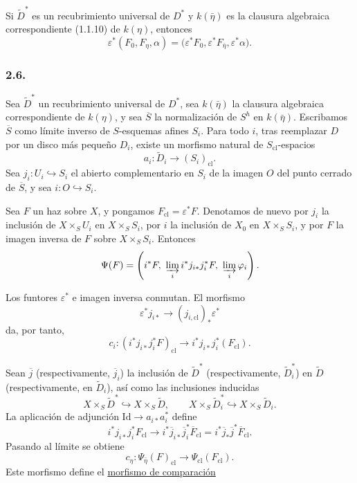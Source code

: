 \pageoriginale

Si $\widetilde D^*$ es un recubrimiento universal de $D^*$ y
$k(\bar\eta)$ es la clausura algebraica correspondiente (1.1.10) de
$k(\eta)$, entonces
\[
\varepsilon^*(F_0,F_\eta,\alpha)
=\bigl(\varepsilon^*F_0,\varepsilon^*F_{\bar\eta},
\varepsilon^*\alpha\bigr).
\]

\subsubsection*{2.6.}
Sea $\widetilde D^*$ un recubrimiento universal de $D^*$, sea
$k(\bar\eta)$ la clausura algebraica correspondiente de $k(\eta)$, y sea
$\overline S$ la normalización de $S^h$ en $k(\bar\eta)$. Escribamos
$\overline S$ como límite inverso de $S$-esquemas afines $S_i$. Para todo
$i$, tras reemplazar $D$ por un disco más pequeño $D_i$, existe un morfismo
natural de $S_{\mathrm{cl}}$-espacios
\[
a_i:\widetilde D_i\longrightarrow(S_i)_{\mathrm{cl}}.
\]
Sea $j_i:U_i\hookrightarrow S_i$ el abierto complementario en $S_i$ de la
imagen $O$ del punto cerrado de $\overline S$, y sea $i:O\hookrightarrow S_i$.

Sea $F$ un haz sobre $X$, y pongamos $F_{\mathrm{cl}}=\varepsilon^*F$.
Denotamos de nuevo por $j_i$ la inclusión de $X\times_SU_i$ en
$X\times_SS_i$, por $i$ la inclusión de $X_0$ en $X\times_SS_i$, y por $F$
la imagen inversa de $F$ sobre $X\times_SS_i$. Entonces
\[
\Psi(F)=
\left(i^*F,\ \varinjlim_i i^*j_{i*}j_i^*F,\
\varinjlim_i\varphi_i\right).
\]

Los funtores $\varepsilon^*$ e imagen inversa conmutan. El morfismo
\[
\varepsilon^*j_{i*}\longrightarrow(j_{i,\mathrm{cl}})_*\varepsilon^*
\]
da, por tanto,
\[
c_i:
(i^*j_{i*}j_i^*F)_{\mathrm{cl}}
\longrightarrow i^*j_{i*}j_i^*(F_{\mathrm{cl}}).
\]

Sean $\overline j$ (respectivamente, $\overline j_i$) la inclusión de
$\widetilde D^*$ (respectivamente, $\widetilde D_i^*$) en
$\widetilde D$ (respectivamente, en $\widetilde D_i$), así como las
inclusiones inducidas
\[
X\times_S\widetilde D^*\hookrightarrow X\times_S\widetilde D,
\qquad
X\times_S\widetilde D_i^*\hookrightarrow X\times_S\widetilde D_i.
\]
La aplicación de adjunción $\mathrm{Id}\longrightarrow a_{i*}a_i^*$ define
\[
i^*j_{i*}j_i^*F_{\mathrm{cl}}
\longrightarrow
i^*\overline j_{i*}\overline j_i^*\overline F_{\mathrm{cl}}
=i^*\overline j_*\overline j^*\overline F_{\mathrm{cl}}.
\]
Pasando al límite se obtiene
\[
c_\eta:\Psi_{\bar\eta}(F)_{\mathrm{cl}}
\longrightarrow\Psi_{\mathrm{cl}}(F_{\mathrm{cl}}).
\]
Este morfismo define el \underline{morfismo de comparación}

